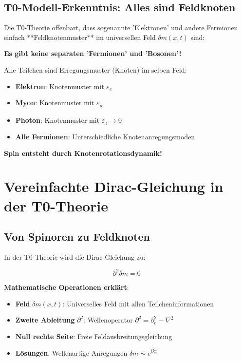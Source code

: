 \documentclass[12pt,a4paper]{article}
\newcommand{\deltam}{\delta m}
\theoremstyle{definition}
\theoremstyle{remark}
\begin{document}
	\subsection{T0-Modell-Erkenntnis: Alles sind Feldknoten}
	
	Die T0-Theorie offenbart, dass sogenannte 'Elektronen' und andere Fermionen einfach **Feldknotenmuster** im universellen Feld $\deltam(x,t)$ sind:
	
	\begin{tcolorbox}[colback=blue!5!white,colframe=blue!75!black,title=Revolutionäre Einsicht]
		\textbf{Es gibt keine separaten 'Fermionen' und 'Bosonen'!}
		
		Alle Teilchen sind Erregungsmuster (Knoten) im selben Feld:
		\begin{itemize}
			\item \textbf{Elektron}: Knotenmuster mit $\varepsilon_e$
			\item \textbf{Myon}: Knotenmuster mit $\varepsilon_\mu$
			\item \textbf{Photon}: Knotenmuster mit $\varepsilon_\gamma \to 0$
			\item \textbf{Alle Fermionen}: Unterschiedliche Knotenanregungsmoden
		\end{itemize}
		
		\textbf{Spin entsteht durch Knotenrotationsdynamik!}
	\end{tcolorbox}
	
	\section{Vereinfachte Dirac-Gleichung in der T0-Theorie}
	
	\subsection{Von Spinoren zu Feldknoten}
	
	In der T0-Theorie wird die Dirac-Gleichung zu:
	
	\begin{equation}
		\boxed{\partial^2 \deltam = 0}
		\label{eq:simplified_dirac}
	\end{equation}
	
	\textbf{Mathematische Operationen erklärt}:
	\begin{itemize}
		\item \textbf{Feld} $\deltam(x,t)$: Universelles Feld mit allen Teilcheninformationen
		\item \textbf{Zweite Ableitung} $\partial^2$: Wellenoperator $\partial^2 = \partial_t^2 - \nabla^2$
		\item \textbf{Null rechte Seite}: Freie Feldausbreitungsgleichung
		\item \textbf{Lösungen}: Wellenartige Anregungen $\deltam \sim e^{ikx}$
	\end{itemize}
	
\end{document}

